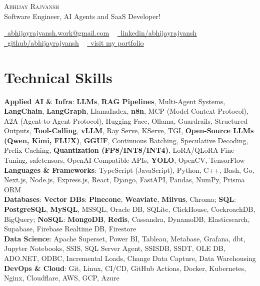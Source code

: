 \documentclass[letterpaper,11pt]{article}
\begin{document}
\begin{center}
    {\Huge \scshape Abhijay Rajvansh} \\ \vspace{1pt}
    Software Engineer, AI Agents and SaaS Developer! \\ \vspace{1pt}

    \small\href{mailto:abhijayrajvansh.work@gmail.com}{\raisebox{-0.2\height}\faEnvelope\  \underline{abhijayrajvansh.work@gmail.com}} ~
    \href{https://www.linkedin.com/in/abhijayrajvansh/}{\raisebox{-0.2\height}\faLinkedin\ \underline{linkedin/abhijayrajvansh}}  ~
    \href{https://github.com/abhijayrajvansh}{\raisebox{-0.2\height}\faGithub\ \underline{github/abhijayrajvansh}} ~
    \href{www.abhijayrajvansh.com}{\raisebox{-0.2\height}\  \underline{visit my portfolio}} ~
    \vspace{-8pt}
\end{center}



\section{Technical Skills}
 \begin{itemize}[leftmargin=0.15in, label={}]
  \small{\item{
   \textbf{Applied AI \& Infra}{: \textbf{LLMs}, \textbf{RAG Pipelines}, Multi-Agent Systems, \textbf{LangChain}, \textbf{LangGraph}, LlamaIndex, \textbf{n8n}, MCP (Model Context Protocol), A2A (Agent-to-Agent Protocol), Hugging Face, Ollama, Guardrails, Structured Outputs, \textbf{Tool-Calling}, \textbf{vLLM}, Ray Serve, KServe, TGI, \textbf{Open-Source LLMs (Qwen, Kimi, FLUX)}, \textbf{GGUF}, Continuous Batching, Speculative Decoding, Prefix Caching, \textbf{Quantization (FP8/INT8/INT4)}, LoRA/QLoRA Fine-Tuning, safetensors, OpenAI-Compatible APIs, \textbf{YOLO}, OpenCV, TensorFlow} \\
   \textbf{Languages \& Frameworks}{: TypeScript (JavaScript), Python, C++, Bash, Go, Next.js, Node.js, Express.js, React, Django, FastAPI, Pandas, NumPy, Prisma ORM} \\
   \textbf{Databases}{: \textbf{Vector DBs}: \textbf{Pinecone}, \textbf{Weaviate}, \textbf{Milvus}, Chroma; \textbf{SQL}: \textbf{PostgreSQL}, \textbf{MySQL}, MSSQL, Oracle DB, SQLite, ClickHouse, CockroachDB, BigQuery; \textbf{NoSQL}: \textbf{MongoDB}, \textbf{Redis}, Cassandra, DynamoDB, Elasticsearch, Supabase, Firebase Realtime DB, Firestore} \\
   \textbf{Data Science}{: Apache Superset, Power BI, Tableau, Metabase, Grafana, dbt, Jupyter Notebooks, SSIS, SQL Server Agent, SSISDB, SSDT, OLE DB, ADO.NET, ODBC, Incremental Loads, Change Data Capture, Data Warehousing} \\
   \textbf{DevOps \& Cloud}{: Git, Linux, CI/CD, GitHub Actions, Docker, Kubernetes, Nginx, Cloudflare, AWS, GCP, Azure} \\
  }}
 \end{itemize}
 \vspace{-16pt}
\end{document}
